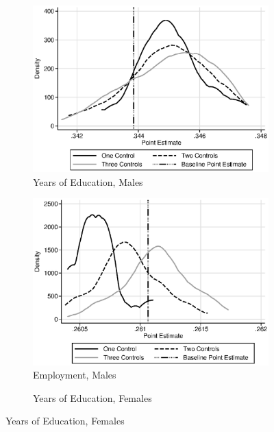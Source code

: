 \begin{figure}
\centering
\caption{Sensitivity to Choice of Control Set, Treatment vs. Alternative Preschool}\label{fig:senstap}
\begin{subfigure}[h]{0.4\textwidth}
		\centering
		\caption{Years of Education, Males}
		\includegraphics[width=\textwidth]{output/sencontrols_male_years_30y_epan_ipw_P1.eps}
\end{subfigure}%
\begin{subfigure}[h]{0.4\textwidth}
	\centering
	\caption{Employment, Males}
		\includegraphics[width=\textwidth]{output/sencontrols_male_si30y_works_epan_ipw_P1.eps}
\end{subfigure}
\begin{subfigure}[h]{0.4\textwidth}
		\centering
		\caption{Years of Education, Females}

\end{subfigure}
\end{figure}
